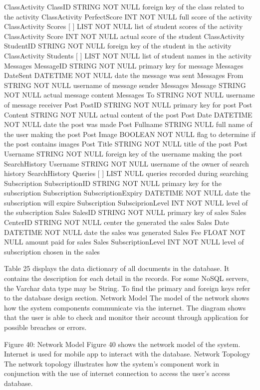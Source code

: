 ClassActivity	ClassID	STRING	NOT NULL	foreign key of the class related to the activity
ClassActivity	PerfectScore	INT	NOT NULL	full score of the activity
ClassActivity	Scores [ ] { }	LIST	NOT NULL	list of student scores of the activity
ClassActivity	 	  Score	INT	NOT NULL	actual score of the student
ClassActivity		  StudentID	STRING	NOT NULL	foreign key of the student in the activity
ClassActivity	Students [ ]	LIST	NOT NULL	list of student names in the activity
Messages	MessageID	STRING	NOT NULL	primary key for message
Messages	DateSent	DATETIME	NOT NULL	date the message was sent
Messages	From	STRING	NOT NULL	username of message sender
Messages	Message	STRING	NOT NULL	actual message content
Messages	To	STRING	NOT NULL	username of message receiver
Post	PostID	STRING	NOT NULL	primary key for post
Post	Content	STRING	NOT NULL	actual content of the post
Post	Date	DATETIME	NOT NULL	date the post was made
Post	Fullname	STRING	NULL	full name of the user making the post
Post	Image	BOOLEAN	NOT NULL	flag to determine if the post contains images
Post	Title	STRING	NOT NULL	title of the post
Post	Username	STRING	NOT NULL	foreign key of the username making the post
SearchHistory	Username	STRING	NOT NULL	username of the owner of search history
SearchHistory	Queries [ ]	LIST	NULL	queries recorded during searching
Subscription	SubscriptionID	STRING	NOT NULL	primary key for the subscription
Subscription	SubscriptionExpiry	DATETIME	NOT NULL	date the subscription will expire
Subscription	SubsciprionLevel	INT	NOT NULL	level of the subscription
Sales	SalesID	STRING	NOT NULL	primary key of sales
Sales	CenterID	STRING	NOT NULL	center the generated the sales
Sales	Date	DATETIME	NOT NULL	date the sales was generated
Sales	Fee	FLOAT	NOT NULL	amount paid for sales
Sales	SubscriptionLevel	INT	NOT NULL	level of subscription chosen in the sales

Table 25 displays the data dictionary of all documents in the database. It contains the description for each detail in the records. For some NoSQL servers, the Varchar data type may be String. To find the primary and foreign keys refer to the database design section.
Network Model
	The model of the network shows how the system components communicate via the internet. The diagram shows that the user is able to check and monitor their account through application for possible breaches or errors.








Figure 40: Network Model
Figure 40 shows the network model of the system. Internet is used for mobile app to interact with the database. 
Network Topology
The network topology illustrates how the system's component work in conjunction with the use of internet connection to access the user's access database.
 
